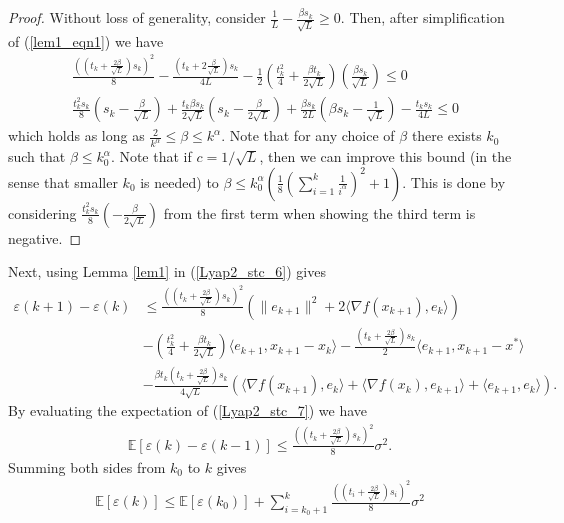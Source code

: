 \documentclass{article}
\theoremstyle{plain}
\theoremstyle{definition}
\theoremstyle{remark}
\begin{document}
        \begin{proof}\label{lem1_proof}
            Without loss of generality, consider $\frac{1}{L}-\frac{\beta s_k}{\sqrt{L}}\geq 0$. Then, after simplification of (\ref{lem1_eqn1}) we have
            \begin{align}\label{lem1_eqn2}
                &\frac{((t_k+\frac{2\beta}{\sqrt{L}})s_k)^2}{8}- \frac{(t_k+2\frac{\beta}{\sqrt{L}})s_k}{4L}-\frac{1}{2}\left(\frac{t_k^2}{4}+\frac{\beta t_k}{2\sqrt{L}} \right)(\frac{\beta s_k}{\sqrt{L}})\leq 0\nonumber\\
                & \frac{t_k^2s_k}{8}(s_k-\frac{\beta}{\sqrt{L}})+\frac{t_k \beta s_k}{2\sqrt{L}}(s_k-\frac{\beta}{2\sqrt{L}})+\frac{\beta s_k}{2 L}(\beta s_k-\frac{1}{\sqrt{L}})-\frac{t_k s_k}{4L}\leq 0
            \end{align}
            which holds as long as $\frac{2}{k^{\alpha}}\leq \beta \leq k^{\alpha}$. Note that for any choice of $\beta$ there exists $k_0$ such that $\beta\leq k_0^{\alpha}$. Note that if \(c=1/\sqrt{L}\), then we can improve this bound (in the sense that smaller \(k_0\) is needed) to $\beta\leq k_0^{\alpha}(\frac{1}{8}(\sum_{i=1}^k\frac{1}{i^{\alpha}})^2+1)$. This is done by considering  \(\frac{t_k^2s_k}{8}(-\frac{\beta}{2\sqrt{L}})\) from the first term when showing the third term is negative. 
        \end{proof}
Next, using Lemma \ref{lem1} in (\ref{Lyap2_stc_6}) gives 
\begin{align}\label{Lyap2_stc_7}
    \varepsilon(k+1)-\varepsilon(k)&\leq \frac{((t_k+\frac{2\beta}{\sqrt{L}})s_k)^2}{8}(\|e_{k+1}\|^2+2\langle \nabla f(x_{k+1}) ,e_k \rangle)\nonumber\\
         & -(\frac{t_k^2}{4}+\frac{\beta t_k}{2\sqrt{L}})\langle e_{k+1},x_{k+1}-x_k\rangle-\frac{(t_k+\tfrac{2\beta}{\sqrt{L}})s_k}{2}\langle e_{k+1},x_{k+1}-x^*\rangle\nonumber\\
         &-\frac{\beta t_k(t_k+\frac{2\beta}{\sqrt{L}})s_k}{4\sqrt{L}}\left(\langle \nabla f(x_{k+1}),e_k \rangle+\langle \nabla f(x_{k}) , e_{k+1}\rangle+\langle e_{k+1},e_k\rangle\right).
\end{align}
    By evaluating the expectation of (\ref{Lyap2_stc_7}) we have
    \begin{align}\label{Lyap2_stc_8}
        \mathbb{E}\left[\varepsilon(k)-\varepsilon(k-1)\right]\leq \frac{((t_k+\frac{2\beta}{\sqrt{L}})s_k)^2}{8}\sigma^2.
    \end{align}
    Summing both sides from $k_0$ to $k$ gives
    \begin{align}\label{Lyap2_stc_9}
        \mathbb E[\varepsilon(k)]\leq \mathbb E[\varepsilon(k_0)]+\sum_{i=k_0+1}^{k}\frac{((t_i+\frac{2\beta}{\sqrt{L}})s_i)^2}{8}\sigma^2
    \end{align}
\end{document}
